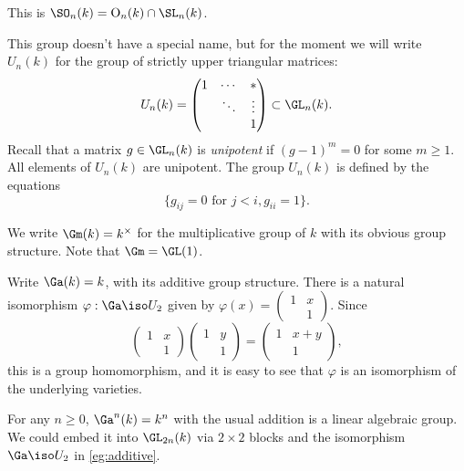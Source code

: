 \begin{example}
This is $\SO_n(k)=\operatorname{O}_n(k)\cap \SL_n(k)$. 
\end{example}

\begin{example}
This group doesn't have a special name, but for the moment we will write 
$U_n(k)$ for the group of strictly upper triangular matrices: 
\[
  U_n(k) = \begin{pmatrix} 1 & \cdots & \ast \\ & \ddots & \vdots \\ & & 1 \end{pmatrix} \subset \GL_n(k) .
\]
Recall that a matrix $g\in \GL_n(k)$ is \emph{unipotent} if $(g-1)^m=0$ for 
some $m\geqslant 1$. All elements of $U_n(k)$ are unipotent. The group $U_n(k)$ 
is defined by the equations 
\[
  \{g_{i j}=0\text{ for }j<i, g_{ii}=1\} .
\]
\end{example}

\begin{example}[Multiplicative]
We write $\Gm(k)=k^\times$ for the multiplicative group of $k$ with its obvious 
group structure. Note that $\Gm=\GL(1)$. 
\end{example}

\begin{example}[Additive]\label{eg:additive}
Write $\Ga(k)=k$, with its additive group structure. There is a natural 
isomorphism $\varphi:\Ga\iso U_2$ given by $\varphi(x)=\begin{pmatrix} 1 & x \\ & 1 \end{pmatrix}$. Since 
\[
  \begin{pmatrix} 1 & x \\ & 1 \end{pmatrix} \begin{pmatrix} 1 & y \\ & 1 \end{pmatrix} = \begin{pmatrix} 1 & x+y \\ & 1 \end{pmatrix} ,
\]
this is a group homomorphism, and it is easy to see that $\varphi$ is an 
isomorphism of the underlying varieties. 
\end{example}

\begin{example}
For any $n\geqslant 0$, $\Ga^n(k)=k^n$ with the usual addition is a linear 
algebraic group. We could embed it into $\GL_{2n}(k)$ via $2\times 2$ blocks 
and the isomorphism $\Ga\iso U_2$ in \autoref{eg:additive}.
\end{example}

